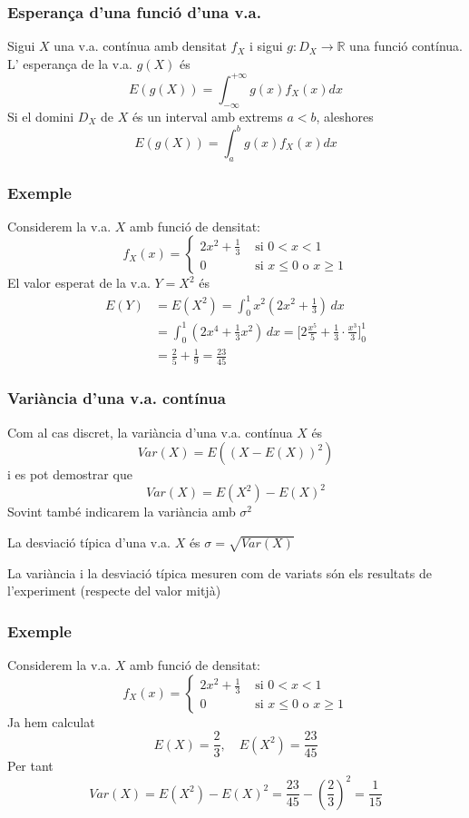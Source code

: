 \documentclass[12pt,t]{beamer}\usepackage[]{graphicx}\usepackage[]{color}
\renewcommand{\emph}[1]{{\color{red}#1}}
\newcommand{\RR}{\mathbb{R}}
\renewcommand{\leq}{\leqslant}
\renewcommand{\geq}{\geqslant}
\theoremstyle{plain}
\theoremstyle{definition}
\begin{document}
\begin{frame}
\frametitle{Esperança d'una funció d'una v.a.}

Sigui $X$ una v.a. contínua amb densitat $f_X$ i sigui  $g:D_X\to \RR$ una funció contínua. 
L' \emph{esperança} de la v.a. $g(X)$ és
$$
E(g(X))=\int_{-\infty}^{+\infty} g(x) f_X(x)dx
$$
Si el  domini $D_X$ de $X$ és  un interval amb extrems $a<b$, aleshores
$$
E(g(X))=\int_{a}^{b} g(x) f_X(x)dx
$$
\end{frame}


\begin{frame}
\frametitle{Exemple}
Considerem  la v.a. $X$  amb funció de densitat:
$$
f_X(x)=\left\{\begin{array}{ll} 2 x^2+\frac{1}{3} &\mbox{ si $0 <x<1$} \\
0 & \mbox{ si $x\leq 0$ o $x\geq 1$} 
 \end{array}\right.
$$
El valor esperat de la v.a. $Y=X^2$ és
$$
\begin{array}{rl}
E(Y)& \displaystyle = E(X^2)=\int_{0}^1 x^2 \left(2 x^2 +\frac{1}{3}\right)\, dx\\[3ex] & \displaystyle = \int_{0}^1
\left(2 x^4 +\frac{1}{3}x^2\right)\, dx =
\Big[2 \frac{x^5}{5}+\frac{1}{3}\cdot
\frac{x^3}{3}\Big]_{0}^{1}\\[3ex] & \displaystyle =\frac{2}{5}+\frac{1}{9}=\frac{23}{
45}
\end{array}
$$

\end{frame}


\begin{frame}
\frametitle{Variància d'una v.a. contínua}

Com al cas  discret, la \emph{variància} d'una v.a. contínua $X$ és
$$
Var(X)=E((X-E(X))^2)
$$
i es pot demostrar que
$$
Var(X)=E(X^2)-E(X)^2
$$
Sovint també indicarem la variància amb $\sigma^2$ 
\medskip

La \emph{desviació típica} d'una v.a. $X$ és $\sigma=\sqrt{Var(X)}$
\bigskip

La variància i la desviació típica mesuren com de variats  són els resultats de l'experiment (respecte del valor mitjà)
\end{frame}

\begin{frame}
\frametitle{Exemple}
Considerem  la v.a. $X$  amb funció de densitat:
$$
f_X(x)=\left\{\begin{array}{ll} 2 x^2+\frac{1}{3} &\mbox{ si $0 <x<1$} \\
0 & \mbox{ si $x\leq 0$ o $x\geq 1$} 
 \end{array}\right.
$$
Ja hem calculat 
$$E(X)=\frac{2}{3},\quad E(X^2)=\frac{23}{45}
$$
Per tant
$$
Var(X)=E(X^2)-E(X)^2= \frac{23}{45}-\left(\frac{2}{3}\right)^2=\frac{1}{15}
$$
\end{frame}
\end{document}
